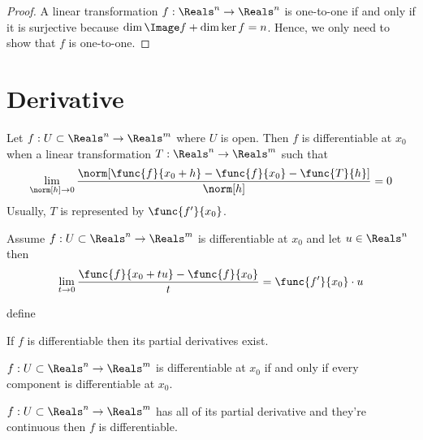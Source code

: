 \begin{proof}
    A linear transformation \(f: \Reals^n \to \Reals^n\) is one-to-one if and only if it is surjective because \(\dim \Image f + \dim \ker f = n\). Hence, we only need to show that \(f\) is one-to-one.
\end{proof}

\section{Derivative}
Let \(f: U \subset \Reals^n \to \Reals^m\) where \(U\) is open. Then \(f\) is differentiable at \(x_0\) when a linear transformation \(T : \Reals^n \to \Reals^m\) such that
\begin{equation*}
    \lim_{\norm[h] \to 0} \dfrac{\norm[\func{f}{x_0 + h} - \func{f}{x_0} - \func{T}{h}]}{\norm[h]}= 0
\end{equation*}
Usually, \(T\) is represented by \(\func{f'}{x_0}\).

\begin{proposition}
    Assume \(f: U \subset \Reals^n \to \Reals^m\) is differentiable at \(x_0\) and let \(u \in \Reals^n\) then
    \begin{equation*}
        \lim_{t \to 0} \dfrac{\func{f}{x_0 + tu} - \func{f}{x_0}}{t} = \func{f'}{x_0} \cdot u
    \end{equation*}
\end{proposition}

\begin{definition}
    define

\end{definition}

\begin{proposition}
    If \(f\) is differentiable then its partial derivatives exist.
\end{proposition}

\begin{proposition}
    \(f : U \subset \Reals^n \to \Reals^m\) is differentiable at \(x_0\) if and only if every component is differentiable at \(x_0\).
\end{proposition}

\begin{theorem}
    \(f : U \subset \Reals^n \to \Reals^m\) has all of its partial derivative and they're continuous then \(f\) is differentiable.
\end{theorem}
